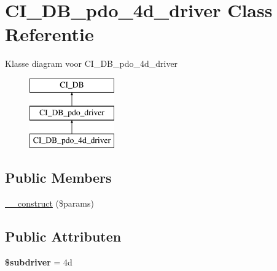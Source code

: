 \hypertarget{class_c_i___d_b__pdo__4d__driver}{}\section{C\+I\+\_\+\+D\+B\+\_\+pdo\+\_\+4d\+\_\+driver Class Referentie}
\label{class_c_i___d_b__pdo__4d__driver}
Klasse diagram voor C\+I\+\_\+\+D\+B\+\_\+pdo\+\_\+4d\+\_\+driver\begin{figure}[H]
\begin{center}
\leavevmode
\includegraphics[height=3.000000cm]{class_c_i___d_b__pdo__4d__driver}
\end{center}
\end{figure}
\subsection*{Public Members}
\begin{DoxyCompactItemize}
\item 
\mbox{\hyperlink{class_c_i___d_b__pdo__4d__driver_a9162320adff1a1a4afd7f2372f753a3e}{\+\_\+\+\_\+construct}} (\$params)
\end{DoxyCompactItemize}
\subsection*{Public Attributen}
\begin{DoxyCompactItemize}
\item 
\mbox{\label{class_c_i___d_b__pdo__4d__driver_a1322ca756348b11d080cb7a4f590de15}} 
{\bfseries \$subdriver} = \textquotesingle{}4d\textquotesingle{}
\end{DoxyCompactItemize}
